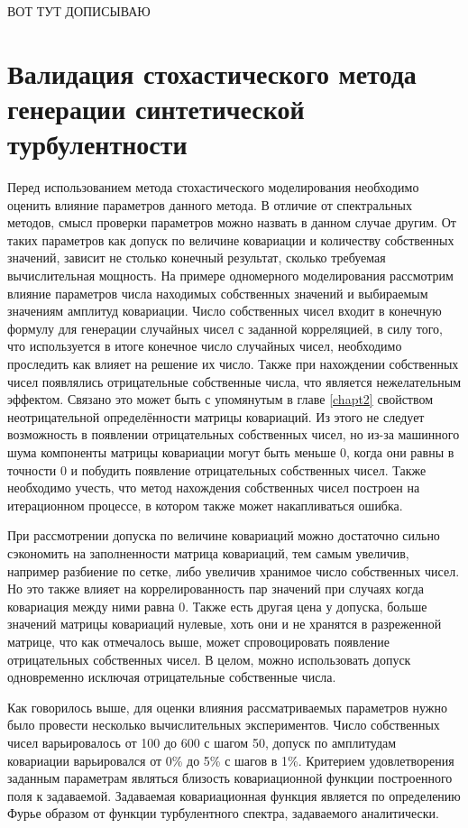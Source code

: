 ВОТ ТУТ ДОПИСЫВАЮ

 
\chapter{Валидация стохастического метода генерации синтетической турбулентности} \label{chapt5}

Перед использованием метода стохастического моделирования необходимо оценить влияние параметров данного метода. В отличие от спектральных методов, смысл проверки параметров можно назвать в данном случае другим. От таких параметров как допуск по величине ковариации и количеству собственных значений, зависит не столько конечный результат, сколько требуемая вычислительная мощность. На примере одномерного моделирования рассмотрим влияние параметров числа находимых собственных значений и выбираемым значениям амплитуд ковариации. Число собственных чисел входит в конечную формулу для генерации случайных чисел с заданной корреляцией, в силу того, что используется в итоге конечное число случайных чисел, необходимо проследить как влияет на решение их число. Также при нахождении собственных чисел появлялись отрицательные собственные числа, что является нежелательным эффектом. Связано это может быть с упомянутым в главе \ref{chapt2} свойством неотрицательной определённости матрицы ковариаций. Из этого не следует возможность в появлении отрицательных собственных чисел, но из-за машинного шума компоненты матрицы ковариации могут быть меньше 0, когда они равны в точности 0 и побудить появление отрицательных собственных чисел. Также необходимо учесть, что метод нахождения собственных чисел построен на итерационном процессе, в котором также может накапливаться ошибка.

При рассмотрении допуска по величине ковариаций можно достаточно сильно сэкономить на заполненности матрица ковариаций, тем самым увеличив, например разбиение по сетке, либо увеличив хранимое число собственных чисел. Но это также влияет на коррелированность пар значений при случаях когда ковариация между ними равна 0. Также есть другая цена у допуска, больше значений матрицы ковариаций нулевые, хоть они и не хранятся в разреженной матрице, что как отмечалось выше, может спровоцировать появление отрицательных собственных чисел. В целом, можно использовать допуск одновременно исключая отрицательные собственные числа.

Как говорилось выше, для оценки влияния рассматриваемых параметров нужно было провести несколько вычислительных экспериментов. Число собственных чисел варьировалось от 100 до 600 с шагом 50, допуск по амплитудам ковариации варьировался от 0\% до 5\% с шагов в 1\%. Критерием удовлетворения заданным параметрам являться близость ковариационной функции построенного поля к задаваемой. Задаваемая ковариационная функция является по определению Фурье образом от функции турбулентного спектра, задаваемого аналитически.

